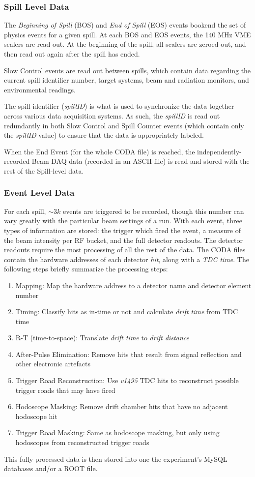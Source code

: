 \subsubsection{Spill Level Data}
The \emph{Beginning of Spill} (BOS) and \emph{End of Spill} (EOS) events bookend the set of physics events for a given spill. At each BOS and EOS events, the 140 MHz VME scalers are read out. At the beginning of the spill, all scalers are zeroed out, and then read out again after the spill has ended.

Slow Control events are read out between spills, which contain data regarding the current spill identifier number, target systems, beam and radiation monitors, and environmental readings.

The spill identifier (\emph{spillID}) is what is used to synchronize the data together across various data acquisition systems. As such, the \emph{spillID} is read out redundantly in both Slow Control and Spill Counter events (which contain only the \emph{spillID} value) to ensure that the data is appropriately labeled.

When the End Event (for the whole CODA file) is reached, the independently-recorded Beam DAQ data (recorded in an ASCII file) is read and stored with the rest of the Spill-level data.

\subsubsection{Event Level Data}\label{sec:event-data}
For each spill, $\sim3k$ events are triggered to be recorded, though this number can vary greatly with the particular beam settings of a run. With each event, three types of information are stored: the trigger which fired the event, a measure of the beam intensity per RF bucket, and the full detector readouts. The detector readouts require the most processing of all the rest of the data. The CODA files contain the hardware addresses of each detector \emph{hit}, along with a \emph{TDC time}. The following steps briefly summarize the processing steps:
\begin{enumerate}
	\item Mapping: Map the hardware address to a detector name and detector element number
	\item Timing: Classify hits as in-time or not and calculate \emph{drift time} from TDC time
	\item R-T (time-to-space): Translate \emph{drift time} to \emph{drift distance}
	\item After-Pulse Elimination: Remove hits that result from signal reflection and other electronic artefacts
	\item Trigger Road Reconstruction: Use \emph{v1495} TDC hits to reconstruct possible trigger roads that may have fired
	\item Hodoscope Masking: Remove drift chamber hits that have no adjacent hodoscope hit
	\item Trigger Road Masking: Same as hodoscope masking, but only using hodoscopes from reconstructed trigger roads
\end{enumerate}
This fully processed data is then stored into one the experiment's MySQL databases and/or a ROOT file.

